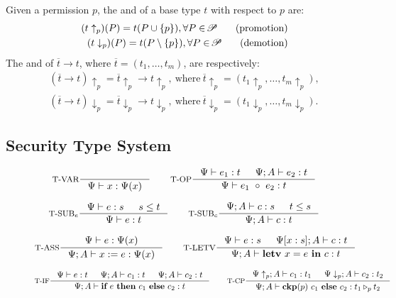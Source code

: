 {{{\begin{definition}\label{def:updown}
Given a permission $p$, the  and  of a base type $t$
with respect to $p$ are: 
{\myeqsize\begin{align*}
(t\uparrow_{p}) (P) = t(P\cup \{p\}), \forall P\in \!\mathscr{P}\!
\tag{promotion}
\\
(t\downarrow_{p}) (P) = t(P\setminus\{p\}), \forall P\in \!\mathscr{P}\!
\tag{demotion}
\end{align*}}
The  and  of $\overline{t}\rightarrow t$,
where $\overline{t} = (t_1,\dots, t_m)$, are respectively:
{\myeqsize\begin{align*}
(\overline{t}\rightarrow t)\uparrow_{p} = \overline{t}\uparrow_{p} \rightarrow t\uparrow_{p},~
\text{where}~\overline{t}\uparrow_{p} = (t_1\uparrow_{p},\ldots, t_m\uparrow_{p}),
\\
(\overline{t}\rightarrow t)\downarrow_{p} = \overline{t}\downarrow_{p}\rightarrow t\downarrow_{p},~
\text{where}~\overline{t}\downarrow_{p} = (t_1\downarrow_{p},\ldots, t_m\downarrow_{p}).
\end{align*}}
\end{definition}








\subsection{Security Type System}\label{sec:typing_rules}


\begin{figure*}
\footnotesize
\[
\inference[T-VAR]{}
{\Psi \vdash \leVAR{x} : \Psi(x)}
\qquad
\inference[T-OP]
{\Psi\vdash e_1: t & \Psi ; A\vdash e_2: t}
{\Psi\vdash \leOP{e_1}{e_2} : t}
\]

\[
\inference[T-SUB$_{e}$]
{\Psi\vdash e : s & s \leq t}
{\Psi\vdash e : t}
\qquad
\inference[T-SUB$_{c}$]
{\Psi; A \vdash c : s & t \leq s}
{\Psi; A\vdash c : t}
\]

\[
\inference[T-ASS]
{\Psi \vdash e : \Psi(x)}
{\Psi ;A \vdash \lcASS{x}{e} : \Psi(x)}
\qquad
\inference[T-LETV]
{\Psi \vdash e : s &
\Psi[x:s]; A \vdash c : t }
{\Psi; A\vdash \lcLETV{x}{e}{c} :  t}
\]

\[
\inference[T-IF]
{\Psi \vdash e : t & \Psi ; A\vdash c_1 : t & \Psi; A \vdash c_2 : t }
{\Psi; A \vdash \lcIF{e}{c_1}{c_2} : t}
\qquad
\inference[T-CP]
{\Psi\uparrow_{p} ; A \vdash c_1 : t_1 &
\Psi\downarrow_{p} ; A\vdash c_2 : t_2}
{\Psi; A\vdash \lcCP{p}{c_1}{c_2} : \omerge p {t_1} {t_2}}
\]


\end{figure*}}}}
